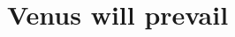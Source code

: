 \documentclass{scrbook}
\begin{document}
	\frontmatter
	
	\title{Venus will prevail}
	\date{}
	
	\maketitle
	

	
	\mainmatter
	
	
	
\end{document}
